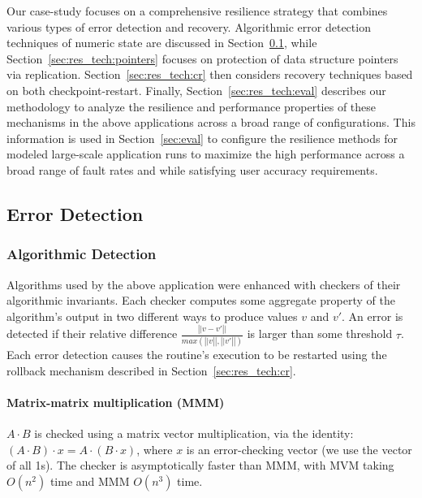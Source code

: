 \documentclass[10pt, conference, compsocconf]{IEEEtran}
\begin{document}
Our case-study focuses on a comprehensive resilience strategy that combines various types of error detection and recovery.
Algorithmic error detection techniques of numeric state are discussed in Section~\ref{sec:res_tech:err_det}, while Section~\ref{sec:res_tech:pointers} focuses on protection of data structure pointers via replication.
Section~\ref{sec:res_tech:cr} then considers recovery techniques based on both checkpoint-restart.%
Finally, Section~\ref{sec:res_tech:eval} describes our methodology to analyze the resilience and performance properties of these mechanisms in the above applications across a broad range of configurations.
This information is used in Section~\ref{sec:eval} to configure the resilience methods for modeled large-scale application runs to maximize the high performance across a broad range of fault rates and while satisfying user accuracy requirements.

\subsection{Error Detection}
\label{sec:res_tech:err_det}

\vspace{-5pt}
\subsubsection{Algorithmic Detection}
\label{sec:res_tech:err_det:algo}

Algorithms used by the above application were enhanced with checkers of their algorithmic invariants.
Each checker computes some aggregate property of the algorithm's output in two different ways to produce values $v$ and $v'$.
An error is detected if their relative difference $\frac{\left|| v-v' \right||}{max(\left||v\right||, \left||v'\right||)}$ is larger than some threshold $\tau$.
Each error detection causes the routine's execution to be restarted using the rollback mechanism described in Section~\ref{sec:res_tech:cr}.

\paragraph{Matrix-matrix multiplication (MMM)}
$A \cdot B$ is checked using a matrix vector multiplication, via the identity: $(A \cdot B) \cdot x = A \cdot (B \cdot x)$, where $x$ is an error-checking vector (we use the vector of all 1s).
The checker is asymptotically faster than MMM, with MVM taking $O(n^2)$ time and MMM $O(n^3)$ time.
\end{document}

